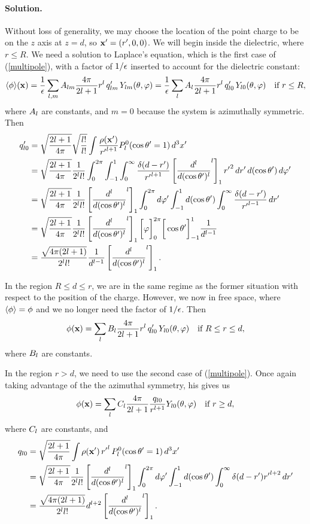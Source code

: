 \documentclass[11pt]{article}
\newcommand{\refeq}[1]{(\ref{#1})}
\newcommand{\beqn}{\begin{equation}}
\newcommand{\eeqn}{\end{equation}}
\newenvironment{solution}
{
    \paragraph{Solution.}
    \ignorespaces
}
{
    \bigskip
}
\begin{document}
\begin{solution}
	Without loss of generality, we may choose the location of the point charge to be on the $z$ axis at $z = d$, so $\mathbf{x}' = (r', 0, 0)$.  We will begin inside the dielectric, where $r \leq R$.  We need a solution to Laplace's equation, which is the first case of \refeq{multipole}, with a factor of $1/\epsilon$ inserted to account for the dielectric constant:
	\beqn \label{A}
		\evphix = \fe \sum_{l, m} A_{l m} \frac{4\pi}{2l + 1} r^l \, \qplm \, \Ylm\tv
		= \fe \sum_{l} \Al \frac{4\pi}{2l + 1} r^l \, q'_{l 0} \, Y_{l 0}\tv \quad \tif r \leq R,
	\eeqn
	where $A_l$ are constants, and $m = 0$ because the system is azimuthally symmetric.  Then
	\begin{align*}
		q'_{l 0} &= \sqrt{\frac{2l + 1}{4\pi}} \sqrt{\frac{l!}{l!}} \int \frac{\rho(\mathbf{x}')}{{r'}^{l+1}} P_l^0(\cos\theta' = 1) \dd[3]{x'} \\
		&= \sqrt{\frac{2l + 1}{4\pi}} \frac{1}{2^l l!} \int_0^{2\pi} \int_{-1}^{1} \int_0^\infty \frac{\delta(d - r')}{{r'}^{l+1}} \left[ \dv[l]{}{(\cos\theta')} (\cos^2\theta' - 1)^l \right]_1 {r'}^2 \dd{r'} \dd{(\cos\theta')} \dd{\varphi'} \\
		&= \sqrt{\frac{2l + 1}{4\pi}} \frac{1}{2^l l!} \left[ \dv[l]{}{(\cos\theta')} (\cos^2\theta' - 1)^l \right]_1 \int_0^{2\pi} \dd{\varphi'} \int_{-1}^{1} \dd{(\cos\theta')} \int_0^\infty \frac{\delta(d - r')}{{r'}^{l-1}} \dd{r'} \\
		&= \sqrt{\frac{2l + 1}{4\pi}} \frac{1}{2^l l!} \left[ \dv[l]{}{(\cos\theta')} (\cos^2\theta' - 1)^l \right]_1 \bigg[ \varphi \bigg]_0^{2\pi} \bigg[ \cos\theta' \bigg]_{-1}^1 \frac{1}{d^{l-1}} \\
		&= \frac{\sqrt{4\pi (2l + 1)}}{2^l l!} \frac{1}{d^{l-1}} \left[ \dv[l]{}{(\cos\theta')} (\cos^2\theta' - 1)^l \right]_1.
	\end{align*}
	
	In the region $R \leq d \leq r$, we are in the same regime as the former situation with respect to the position of the charge.  However, we now in free space, where $\ev\phi = \phi$ and we no longer need the factor of $1/\epsilon$.  Then
	\beqn \label{B}
		\phix = \sum_{l} \Bl \frac{4\pi}{2l + 1} r^l \, q'_{l 0} \, Y_{l 0}\tv \quad \tif R \leq r \leq d,
	\eeqn
	where $B_l$ are constants.
	
	In the region $r > d$, we need to use the second case of \refeq{multipole}.  Once again taking advantage of the the azimuthal symmetry, his gives us
	\beqn \label{C|}
		\phix = \sum_{l} \Cl \frac{4\pi}{2l + 1} \frac{q_{l 0}}{r^{l+1}} Y_{l 0}\tv \quad \tif r \geq d,
	\eeqn
	where $C_l$ are constants, and
	\begin{align*}
		q_{l 0} &= \sqrt{\frac{2l + 1}{4\pi}} \int \rho(\mathbf{x}') \, {r'}^l \, P_l^0(\cos\theta' = 1) \dd[3]{x'} \\
		&= \sqrt{\frac{2l + 1}{4\pi}} \frac{1}{2^l l!} \left[ \dv[l]{}{(\cos\theta')} (\cos^2\theta' - 1)^l \right]_1 \int_0^{2\pi} \dd{\varphi'} \int_{-1}^{1} \dd{(\cos\theta')} \int_0^\infty \delta(d - r') {r'}^{l+2} \dd{r'} \\
		&= \frac{\sqrt{4\pi (2l + 1)}}{2^l l!} d^{l+2} \left[ \dv[l]{}{(\cos\theta')} (\cos^2\theta' - 1)^l \right]_1.
	\end{align*}
	

\end{solution}
\end{document}
